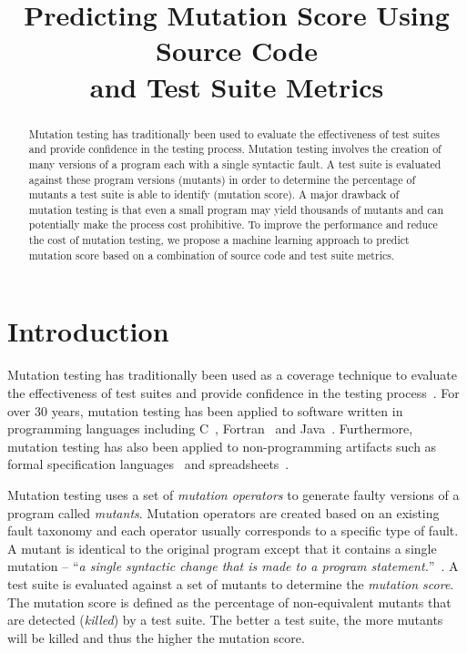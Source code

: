 \documentclass[conference]{IEEEtran}
\begin{document}
\title{Predicting Mutation Score Using Source Code\\and Test Suite Metrics}


\author{
}


\maketitle


\begin{abstract}
Mutation testing has traditionally been used to evaluate the effectiveness of test suites and provide confidence in the testing process. Mutation testing involves the creation of many versions of a program each with a single syntactic fault. A test suite is evaluated against these program versions (mutants) in order to determine the percentage of mutants a test suite is able to identify (mutation score). A major drawback of mutation testing is that even a small program may yield thousands of mutants and can potentially make the process cost prohibitive. To improve the performance and reduce the cost of mutation testing, we propose a machine learning approach to predict mutation score based on a combination of source code and test suite metrics.
\end{abstract}


\IEEEpeerreviewmaketitle


\section{Introduction}
\label{sec:introduction}
Mutation testing has traditionally been used as a coverage technique to evaluate the effectiveness of test suites and provide confidence in the testing process~\cite{DLS78, OAL06, JH10}. For over 30 years, mutation testing has been applied to software written in programming languages including C~\cite{DM96, JH08}, Fortran~\cite{KO91} and Java~\cite{MKO02, BCD06}. Furthermore, mutation testing has also been applied to non-programming artifacts such as formal specification languages~\cite{ABM98} and spreadsheets~\cite{AE09}.

Mutation testing uses a set of \emph{mutation operators} to generate faulty versions of a program called \emph{mutants}. Mutation operators are created based on an existing fault taxonomy and each operator usually corresponds to a specific type of fault. A mutant is identical to the original program except that it contains a single mutation -- ``\emph{a single syntactic change that is made to a program statement.}''~\cite{KO91}. A test suite is evaluated against a set of mutants to determine the \emph{mutation score}. The mutation score is defined as the percentage of non-equivalent mutants that are detected (\emph{killed}) by a test suite. The better a test suite, the more mutants will be killed and thus the higher the mutation score.
\end{document}
